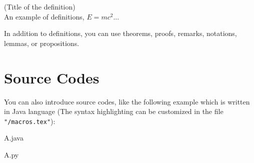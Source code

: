 \begin{definition} \label{def:example}
	(Title of the definition)\\
	An example of definitions, $E=mc^2$...
\end{definition}

In addition to definitions, you can use theorems, proofs, remarks, notations, lemmas, or propositions.

\section{Source Codes}

You can also introduce source codes, like the following example which is written in Java language (The syntax highlighting can be customized in the file \texttt{"/macros.tex"}):

\begin{sourcecode}{A.java}
	
\end{sourcecode}
\begin{sourcecode}{A.py}
	
\end{sourcecode}

